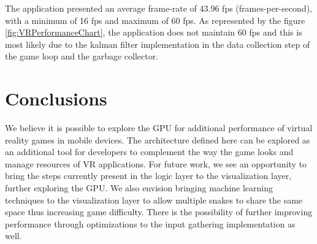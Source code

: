 \documentclass[runningheads]{llncs}
\begin{document}
The application presented an average frame-rate of 43.96 fps (frames-per-second), with a minimum of 16 fps and maximum of 60 fps. As represented by the figure \ref{fig:VRPerformanceChart}, the application does not maintain 60 fps and this is most likely due to the kalman filter implementation in the data collection step of the game loop and the garbage collector.


\section{Conclusions}
We believe it is possible to explore the GPU for additional performance of virtual reality games in mobile devices. The architecture defined here can be explored as an additional tool for developers to complement the way the game looks and manage resources of VR applications. For future work, we see an opportunity to bring the steps currently present in the logic layer to the visualization layer, further exploring the GPU. We also envision bringing machine learning techniques to the visualization layer to allow multiple snakes to share the same space thus increasing game difficulty. There is the possibility of further improving performance through optimizations to the input gathering implementation as well.
%
%
%


\end{document}
